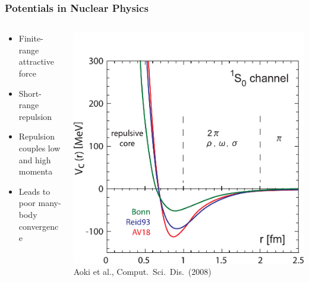 \documentclass[accentcolor=tud2c,usenames,dvipsnames,colorbacktitle,inverttitle,landscape,german,presentation,t]{tudbeamer}
\begin{document}
  \begin{frame}
    \frametitle{Potentials in Nuclear Physics}
    \begin{columns}[c]
      \begin{column}{0.6\textwidth}
        \begin{itemize}
          \item Finite-range attractive force
          \item Short-range repulsion
          \item Repulsion couples low and high momenta
          \item Leads to poor many-body convergence
        \end{itemize}
      \end{column}
      \begin{column}{0.4\textwidth}
        \begin{center}
          \includegraphics[width=\textwidth]{figures/02/hatsuda_phen-pot_new}
          \small{Aoki et al., Comput.~Sci.~Dis.~(2008)}
        \end{center}
      \end{column}
    \end{columns}
  \end{frame}
\end{document}
